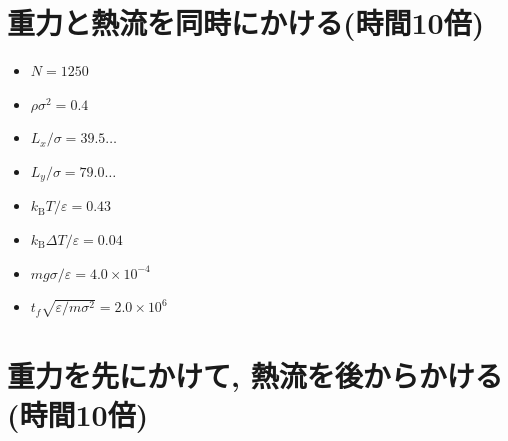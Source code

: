 

\section{重力と熱流を同時にかける(時間10倍)}

\begin{itemize}
  \item $N = 1250$
  \item $\rho {\sigma}^2 = 0.4$
  \item $L_x / \sigma = 39.5\dots$
  \item $L_y / \sigma = 79.0\dots$
  \item $k_{\text{B}} T / \varepsilon = 0.43$
  \item $k_{\text{B}} \Delta T / \varepsilon = 0.04$
  \item $mg\sigma/\varepsilon = 4.0 \times 10^{-4}$
  \item $t_f \sqrt{\varepsilon / m \sigma^2} = 2.0 \times 10^{6}$
\end{itemize}



\section{重力を先にかけて, 熱流を後からかける(時間10倍)}

